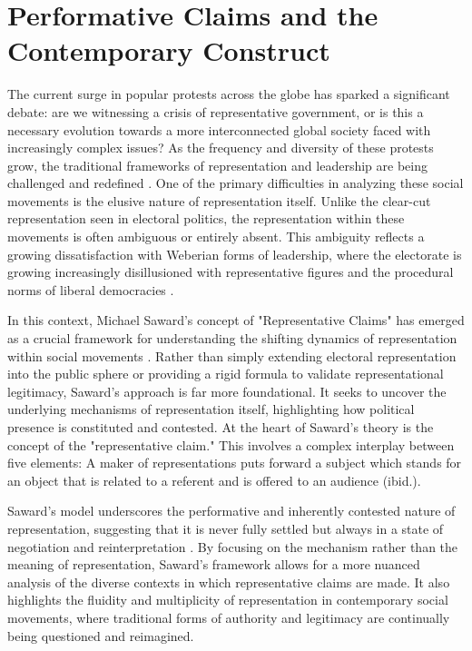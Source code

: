 \chapter{Performative Claims and the Contemporary Construct}

The current surge in popular protests across the globe has sparked a significant debate: are we witnessing a crisis of representative government, or is this a necessary evolution towards a more interconnected global society faced with increasingly complex issues? As the frequency and diversity of these protests grow, the traditional frameworks of representation and leadership are being challenged and redefined \parencite[see 1039]{hayat2022}. One of the primary difficulties in analyzing these social movements is the elusive nature of representation itself. Unlike the clear-cut representation seen in electoral politics, the representation within these movements is often ambiguous or entirely absent. This ambiguity reflects a growing dissatisfaction with Weberian forms of leadership, where the electorate is growing increasingly disillusioned with representative figures and the procedural norms of liberal democracies \parencite[see for example 5-14]{hardt2017}.

In this context, Michael Saward's concept of "Representative Claims" has emerged as a crucial framework for understanding the shifting dynamics of representation within social movements \parencite[-]{saward2010}. Rather than simply extending electoral representation into the public sphere or providing a rigid formula to validate representational legitimacy, Saward's approach is far more foundational. It seeks to uncover the underlying mechanisms of representation itself, highlighting how political presence is constituted and contested. At the heart of Saward's theory is the concept of the "representative claim." This involves a complex interplay between five elements: A maker of representations puts forward a subject which stands for an object that is related to a referent and is offered to an audience (ibid.).

Saward's model underscores the performative and inherently contested nature of representation, suggesting that it is never fully settled but always in a state of negotiation and reinterpretation \parencite[see 36-37]{saward2010}. By focusing on the mechanism rather than the meaning of representation, Saward's framework allows for a more nuanced analysis of the diverse contexts in which representative claims are made. It also highlights the fluidity and multiplicity of representation in contemporary social movements, where traditional forms of authority and legitimacy are continually being questioned and reimagined.

